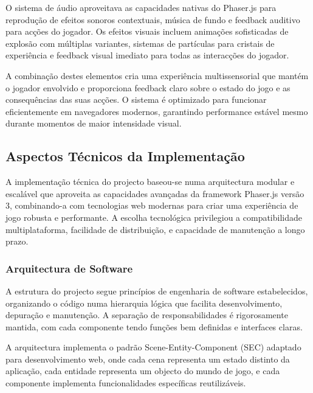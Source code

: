 \hspace{2em} O sistema de áudio aproveitava as capacidades nativas do Phaser.js para reprodução de efeitos sonoros contextuais, música de fundo e feedback auditivo para acções do jogador. Os efeitos visuais incluem animações sofisticadas de explosão com múltiplas variantes, sistemas de partículas para cristais de experiência e feedback visual imediato para todas as interacções do jogador.

\hspace{2em} A combinação destes elementos cria uma experiência multissensorial que mantém o jogador envolvido e proporciona feedback claro sobre o estado do jogo e as consequências das suas acções. O sistema é optimizado para funcionar eficientemente em navegadores modernos, garantindo performance estável mesmo durante momentos de maior intensidade visual.

\newpage
\subsection{Aspectos Técnicos da Implementação}
\hspace{2em} A implementação técnica do projecto baseou-se numa arquitectura modular e escalável que aproveita as capacidades avançadas da framework Phaser.js versão 3, combinando-a com tecnologias web modernas para criar uma experiência de jogo robusta e performante. A escolha tecnológica privilegiou a compatibilidade multiplataforma, facilidade de distribuição, e capacidade de manutenção a longo prazo.

\subsubsection{Arquitectura de Software}
\hspace{2em} A estrutura do projecto segue princípios de engenharia de software estabelecidos, organizando o código numa hierarquia lógica que facilita desenvolvimento, depuração e manutenção. A separação de responsabilidades é rigorosamente mantida, com cada componente tendo funções bem definidas e interfaces claras.

\hspace{2em} A arquitectura implementa o padrão Scene-Entity-Component (SEC) adaptado para desenvolvimento web, onde cada cena representa um estado distinto da aplicação, cada entidade representa um objecto do mundo de jogo, e cada componente implementa funcionalidades específicas reutilizáveis.

